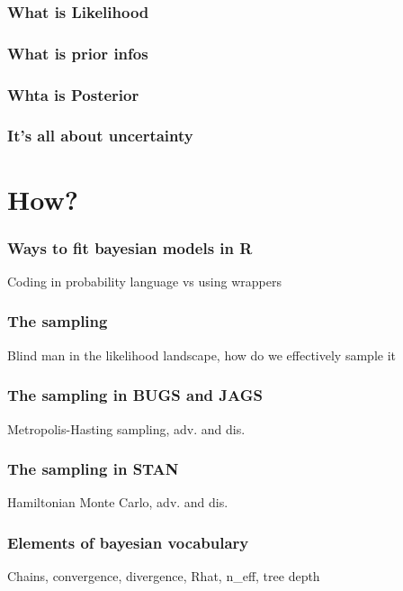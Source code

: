 \documentclass{beamer}
\begin{document}
  \begin{frame}
  \frametitle{\bf What is Likelihood}
  
 \end{frame}
 
  \begin{frame}
  \frametitle{\bf What is prior infos}
  
 \end{frame}
 
  \begin{frame}
  \frametitle{\bf Whta is Posterior}
  
 \end{frame}
 
  \begin{frame}
  \frametitle{\bf It's all about uncertainty}
  
 \end{frame}
 
  
\section{How?}

 \begin{frame}
  \frametitle{\bf Ways to fit bayesian models in R}
  
  Coding in probability language vs using wrappers
  
 \end{frame}

  \begin{frame}
  \frametitle{\bf The sampling}
  
  Blind man in the likelihood landscape, how do we effectively sample it
  
 \end{frame}

  \begin{frame}
  \frametitle{\bf The sampling in BUGS and JAGS}
  
  Metropolis-Hasting sampling, adv. and dis.
  
 \end{frame}
 
  \begin{frame}
  \frametitle{\bf The sampling in STAN}
  
  Hamiltonian Monte Carlo, adv. and dis.
  
 \end{frame}
 
  \begin{frame}
  \frametitle{\bf Elements of bayesian vocabulary}
  
  Chains, convergence, divergence, Rhat, n\_eff, tree depth
  
 \end{frame}
 
\end{document}
